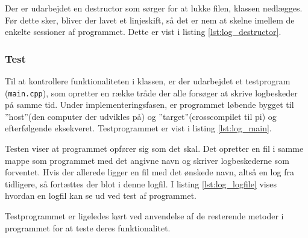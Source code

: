 

Der er udarbejdet en destructor som sørger for at lukke filen, klassen nedlægges. Før dette sker, bliver der lavet et linjeskift, så det er nem at skelne imellem de enkelte sessioner af programmet. Dette er vist i listing \ref{lst:log_destructor}.



\subsubsection{Test}
Til at kontrollere funktionaliteten i klassen, er der udarbejdet et testprogram (\texttt{main.cpp}), som opretter en række tråde der alle forsøger at skrive logbeskeder på samme tid. Under implementeringsfasen, er programmet løbende bygget til ''host''(den computer der udvikles på) og ''target''(crosscompilet til pi) og efterfølgende eksekveret. Testprogrammet er vist i listing \ref{lst:log_main}.



Testen viser at programmet opfører sig som det skal. Det opretter en fil i samme mappe som programmet med det angivne navn og skriver logbeskederne som forventet. Hvis der allerede ligger en fil med det ønskede navn, altså en log fra tidligere, så fortættes der blot i denne logfil. I listing \ref{lst:log_logfile} vises hvordan en logfil kan se ud ved test af programmet.



Testprogrammet er ligeledes kørt ved anvendelse af de resterende metoder i programmet for at teste deres funktionalitet.